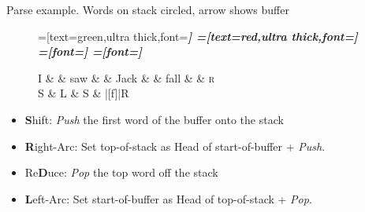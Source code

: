 \documentclass{lecture}
\begin{document}
\begin{plain}{Parse example. Words on stack circled, arrow shows buffer}
\begin{figure}
    \centering
    \begin{dependency}[theme=simple]
    =[text=green,ultra thick,font=\bfseries\itshape]
    =[text=red,ultra thick,font=\bfseries\itshape]
    =[font=\bfseries\itshape]
    =[font=\itshape]
    \begin{deptext}[column sep=.075cm, row sep=.1ex]
        I \&           \& saw \&          \& Jack       \& \& fall   \& \& \textsc{r} \\
        S   \& L \& S \& |[f]|R \\ 
    \end{deptext}
\end{dependency}
\end{figure}
    \begin{itemize}
        \item \textbf{S}hift: \emph{Push} the first word of the buffer onto the stack
    \item \textbf{R}ight-Arc: Set top-of-stack as Head of start-of-buffer + \emph{Push}.
    \item Re\textbf{D}uce: \emph{Pop} the top word off the stack
    \item \textbf{L}eft-Arc: Set start-of-buffer as Head of top-of-stack + \emph{Pop}.
    \end{itemize}
\end{plain}
\end{document}
